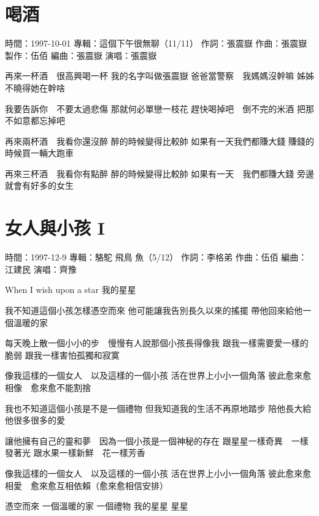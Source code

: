 \documentclass[UTF8,a4paper,oneside,twocolumn,12pt]{ctexbook}
\newcommand{\infopair}[2]{\textbullet #1：#2}
\newcommand{\zc}[1][伍佰]{\infopair{作詞}{#1}}
\newcommand{\zq}[1][伍佰]{\infopair{作曲}{#1}}
\newcommand{\bq}[1][伍佰]{\infopair{編曲}{#1}}
\newcommand{\zj}[1]{\infopair{專輯}{#1}}
\newcommand{\zz}[1]{\infopair{製作}{#1}}
\newcommand{\sj}[1]{\infopair{時間}{#1}}
\newenvironment{info}{\begin{flushleft}\kaishu
	}
	{\end{flushleft}\normalsize\yahei\par}
\newenvironment{lyric}{
	}
{}
\begin{document}
\section{喝酒}
\begin{info}
	\sj{1997-10-01}
	\zj{這個下午很無聊（11/11）}
	\zc[張震嶽]
	\zq[張震嶽]
	\zz{伍佰}
	\bq[張震嶽]
	\infopair{演唱}{張震嶽}
\end{info}
\begin{lyric}
	再來一杯酒　很高興喝一杯
	我的名字叫做張震嶽
	爸爸當警察　我媽媽沒幹嘛
	姊姊不曉得她在幹啥

	我要告訴你　不要太過悲傷
	那就何必單戀一枝花
	趕快喝掉吧　倒不完的米酒
	把那不如意都忘掉吧

	再來兩杯酒　我看你還沒醉
	醉的時候變得比較帥
	如果有一天我們都賺大錢
	賺錢的時候買一輛大跑車

	再來三杯酒　我看你有點醉
	醉的時候變得比較帥
	如果有一天　我們都賺大錢
	旁邊就會有好多的女生
\end{lyric}

\section{女人與小孩 I}
\begin{info}
	\sj{1997-12-9}
	\zj{駱駝 飛鳥 魚（5/12）}
	\zc[李格弟]
	\zq
	\bq[江建民]
	\infopair{演唱}{齊豫}
\end{info}
\begin{lyric}
	When I wish upon a star
	我的星星

	我不知道這個小孩怎樣憑空而來
	他可能讓我告別長久以來的搖擺
	帶他回來給他一個溫暖的家

	每天晚上散一個小小的步　慢慢有人說那個小孩長得像我
	跟我一樣需要愛一樣的脆弱
	跟我一樣害怕孤獨和寂寞

	像我這樣的一個女人　以及這樣的一個小孩
	活在世界上小小一個角落
	彼此愈來愈相像　愈來愈不能割捨

	我也不知道這個小孩是不是一個禮物
	但我知道我的生活不再原地踏步
	陪他長大給他很多很多的愛

	讓他擁有自己的靈和夢　因為一個小孩是一個神秘的存在
	跟星星一樣奇異　一樣發著光
	跟水果一樣新鮮　花一樣芳香

	像我這樣的一個女人　以及這樣的一個小孩
	活在世界上小小一個角落
	彼此愈來愈相愛　愈來愈互相依賴（愈來愈相信安排）

	憑空而來
	一個溫暖的家
	一個禮物
	我的星星
	星星
\end{lyric}
\end{document}
